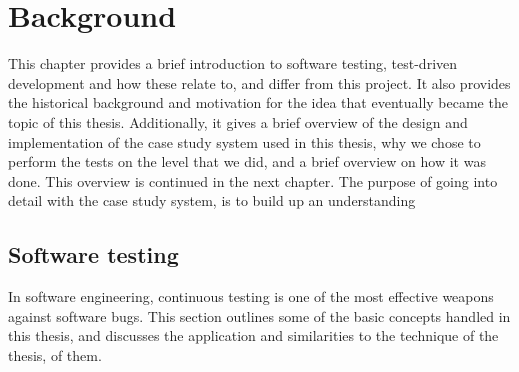 \chapter{Background}
\label{ch:background}
This chapter provides a brief introduction to software testing, test-driven development and how these relate to, and differ from this project. It also provides the historical background and motivation for the idea that eventually became the topic of this thesis. Additionally, it gives a brief overview of the design and implementation of the case study system used in this thesis, why we chose to perform the tests on the level that we did, and a brief overview on how it was done. This overview is continued in the next chapter. The purpose of going into detail with the case study system, is to build up an understanding 

\section{Software testing}
In software engineering, continuous testing is one of the most effective weapons against software bugs. This section outlines some of the basic concepts handled in this thesis, and discusses the application and similarities to the technique of the thesis, of them.

